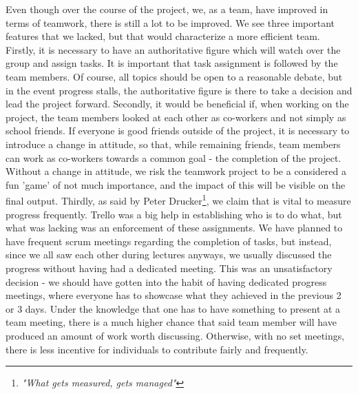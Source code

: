 \documentclass{report}
\begin{document}
		Even though over the course of the project, we, as a team, have improved in terms of teamwork, there is still a lot to be improved. We see three important features that we lacked, but that would characterize a more efficient team. Firstly, it is necessary to have an authoritative figure which will watch over the group and assign tasks. It is important that task assignment is followed by the team members. Of course, all topics should be open to a reasonable debate, but in the event progress stalls, the authoritative figure is there to take a decision and lead the project forward. Secondly, it would be beneficial if, when working on the project, the team members looked at each other as co-workers and not simply as school friends. If everyone is good friends outside of the project, it is necessary to introduce a change in attitude, so that, while remaining friends, team members can work as co-workers towards a common goal - the completion of the project. Without a change in attitude, we risk the teamwork project to be a considered a fun 'game' of not much importance, and the impact of this will be visible on the final output. Thirdly, as said by Peter Drucker\footnote{\emph{"What gets measured, gets managed"}}, we claim that is vital to measure progress frequently. Trello was a big help in establishing who is to do what, but what was lacking was an enforcement of these assignments. We have planned to have frequent scrum meetings regarding the completion of tasks, but instead, since we all saw each other during lectures anyways, we usually discussed the progress without having had a dedicated meeting. This was an unsatisfactory decision - we should have gotten into the habit of having dedicated progress meetings, where everyone has to showcase what they achieved in the previous 2 or 3 days. Under the knowledge that one has to have something to present at a team meeting, there is a much higher chance that said team member will have produced an amount of work worth discussing. Otherwise, with no set meetings, there is less incentive for individuals to contribute fairly and frequently.
\end{document}
